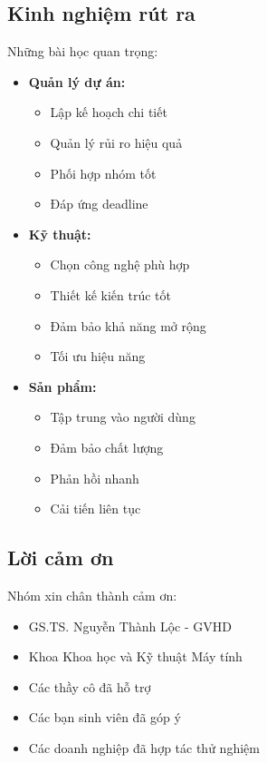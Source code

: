 \subsection{Kinh nghiệm rút ra}
\hspace{0.5cm}Những bài học quan trọng:

\begin{itemize}
    \item \textbf{Quản lý dự án:}
    \begin{itemize}
        \item Lập kế hoạch chi tiết
        \item Quản lý rủi ro hiệu quả
        \item Phối hợp nhóm tốt
        \item Đáp ứng deadline
    \end{itemize}
    
    \item \textbf{Kỹ thuật:}
    \begin{itemize}
        \item Chọn công nghệ phù hợp
        \item Thiết kế kiến trúc tốt
        \item Đảm bảo khả năng mở rộng
        \item Tối ưu hiệu năng
    \end{itemize}
    
    \item \textbf{Sản phẩm:}
    \begin{itemize}
        \item Tập trung vào người dùng
        \item Đảm bảo chất lượng
        \item Phản hồi nhanh
        \item Cải tiến liên tục
    \end{itemize}
\end{itemize}

\subsection{Lời cảm ơn}
\hspace{0.5cm}Nhóm xin chân thành cảm ơn:

\begin{itemize}
    \item GS.TS. Nguyễn Thành Lộc - GVHD
    \item Khoa Khoa học và Kỹ thuật Máy tính
    \item Các thầy cô đã hỗ trợ
    \item Các bạn sinh viên đã góp ý
    \item Các doanh nghiệp đã hợp tác thử nghiệm
\end{itemize} 